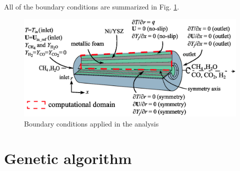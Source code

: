 \documentclass[preprint,12pt]{elsarticle}
\begin{document}
All of the boundary conditions are summarized in Fig. \ref{fig:boundary}.

\begin{figure}
\centering
\includegraphics[width=120mm]{boundary.eps}
\caption{\label{fig:boundary}Boundary conditions applied in the analysis} 
\end{figure}

\section{Genetic algorithm}
\label{sec:ga}
\end{document}
